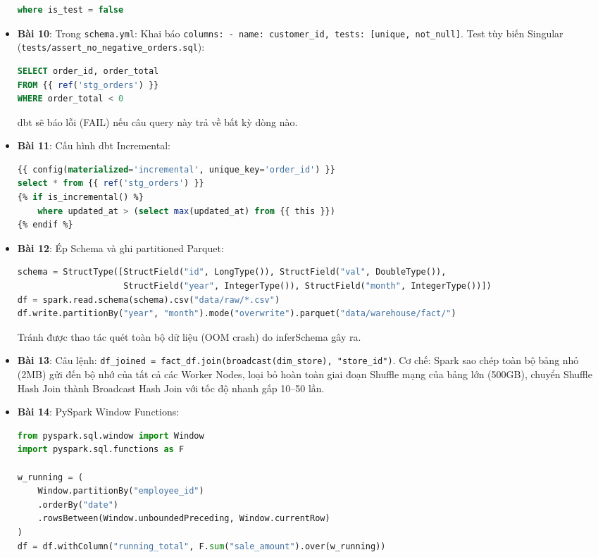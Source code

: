 \begin{dapanbox}
\begin{itemize}
\begin{lstlisting}[language=sql]
where is_test = false
    \end{lstlisting}
    \item \textbf{Bài 10}: Trong \texttt{schema.yml}: Khai báo \texttt{columns: - name: customer\_id, tests: [unique, not\_null]}. Test tùy biến Singular (\texttt{tests/assert\_no\_negative\_orders.sql}):
    \begin{lstlisting}[language=sql]
SELECT order_id, order_total 
FROM {{ ref('stg_orders') }} 
WHERE order_total < 0
    \end{lstlisting}
    dbt sẽ báo lỗi (FAIL) nếu câu query này trả về bất kỳ dòng nào.
    \item \textbf{Bài 11}: Cấu hình dbt Incremental:
    \begin{lstlisting}[language=sql]
{{ config(materialized='incremental', unique_key='order_id') }}
select * from {{ ref('stg_orders') }}
{% if is_incremental() %}
    where updated_at > (select max(updated_at) from {{ this }})
{% endif %}
    \end{lstlisting}
    \item \textbf{Bài 12}: Ép Schema và ghi partitioned Parquet:
    \begin{lstlisting}[language=python]
schema = StructType([StructField("id", LongType()), StructField("val", DoubleType()),
                     StructField("year", IntegerType()), StructField("month", IntegerType())])
df = spark.read.schema(schema).csv("data/raw/*.csv")
df.write.partitionBy("year", "month").mode("overwrite").parquet("data/warehouse/fact/")
    \end{lstlisting}
    Tránh được thao tác quét toàn bộ dữ liệu (OOM crash) do inferSchema gây ra.
    \item \textbf{Bài 13}: Câu lệnh: \texttt{df\_joined = fact\_df.join(broadcast(dim\_store), "store\_id")}. Cơ chế: Spark sao chép toàn bộ bảng nhỏ (2MB) gửi đến bộ nhớ của tất cả các Worker Nodes, loại bỏ hoàn toàn giai đoạn Shuffle mạng của bảng lớn (500GB), chuyển Shuffle Hash Join thành Broadcast Hash Join với tốc độ nhanh gấp 10--50 lần.
    \item \textbf{Bài 14}: PySpark Window Functions:
    \begin{lstlisting}[language=python]
from pyspark.sql.window import Window
import pyspark.sql.functions as F

w_running = (
    Window.partitionBy("employee_id")
    .orderBy("date")
    .rowsBetween(Window.unboundedPreceding, Window.currentRow)
)
df = df.withColumn("running_total", F.sum("sale_amount").over(w_running))


\end{lstlisting}
\end{itemize}
\end{dapanbox}
